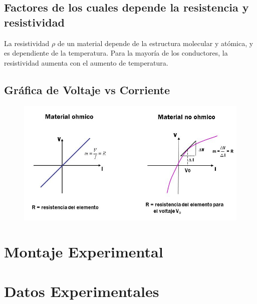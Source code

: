 \documentclass[letterpaper, 12pt]{report}
\begin{document}
\subsection*{Factores de los cuales depende la resistencia y resistividad}

La resistividad $\rho$ de un material depende de la estructura molecular y
atómica, y es dependiente de la temperatura. Para la mayoría de los conductores,
la resistividad aumenta con el aumento de temperatura.~\cite{KhanAcademy}

\subsection*{Gráfica de Voltaje vs Corriente}

\begin{figure}[H]
	\begin{center}
		\includegraphics[scale = 0.5]{./Images/VoltajeVsResistencia.jpg}
	\end{center}
\end{figure}


\section{Montaje Experimental}

\section{Datos Experimentales}
\end{document}
